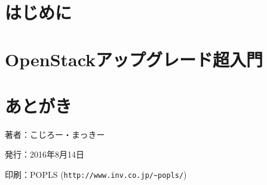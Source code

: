 \documentclass[9pt,b5paper,tombo,openany]{jsbook}
\begin{document}
\tableofcontents

\chapter{はじめに}

\setcounter{page}{1}

\chapter{OpenStackアップグレード超入門}


\chapter{あとがき}

\thispagestyle{empty}
\begin{flushright}
\begin{minipage}{0.5\hsize}
\begin{description}
  \item{著者：}こじろー・まっきー
  \item{発行：}2016年8月14日
  \item{印刷：}POPLS (\verb|http://www.inv.co.jp/~popls/|)
\end{description}
\end{minipage}
\end{flushright}
\end{document}
